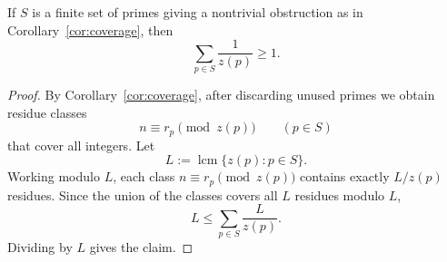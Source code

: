 \begin{corollary}\label{cor:recipsum}
If $S$ is a finite set of primes giving a nontrivial obstruction as in Corollary~\ref{cor:coverage}, then
\[
\sum_{p\in S}\frac{1}{z(p)}\ge 1.
\]
\end{corollary}
\begin{proof}
By Corollary~\ref{cor:coverage}, after discarding unused primes we obtain residue classes
\[
n\equiv r_p\pmod{z(p)} \qquad (p\in S)
\]
that cover all integers. Let
\[
L:=\operatorname{lcm}\{z(p):p\in S\}.
\]
Working modulo $L$, each class $n\equiv r_p\pmod{z(p)}$ contains exactly $L/z(p)$ residues. Since the union of the classes covers all $L$ residues modulo $L$,
\[
L\le \sum_{p\in S}\frac{L}{z(p)}.
\]
Dividing by $L$ gives the claim.
\end{proof}

